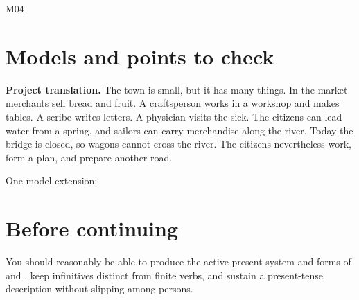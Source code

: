 \begin{courseunit}{M04}
\ifsolutions
\section{Models and points to check}

\textbf{Project translation.} The town is small, but it has many things. In
the market merchants sell bread and fruit. A craftsperson works in a workshop
and makes tables. A scribe writes letters. A physician visits the sick. The
citizens can lead water from a spring, and sailors can carry merchandise along
the river. Today the bridge is closed, so wagons cannot cross the river. The
citizens nevertheless work, form a plan, and prepare another road.

One model extension: 
\else
\section{Before continuing}

You should reasonably be able to produce the active present system and forms
of  and , keep infinitives distinct from finite verbs,
and sustain a present-tense description without slipping among persons.
\fi
\end{courseunit}

